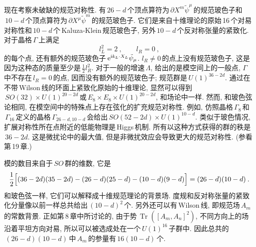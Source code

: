现在考察未破缺的规范对称性. 有\,$26{-}d$\,个顶点算符为$\,\partial X^{m}\tilde{\psi}^{\mu}\,$的规范玻色子和$\,10{-}d\,$个顶点算符为$\,\partial X^{\mu}\tilde{\psi}^{m}\,$的规范玻色子.  它们是来自十维理论的原始\,16\,个对易对称性和$\,10-d\,$个\,Kaluza-Klein\,规范玻色子, 另外\,$10-d\,$个反对称张量的紧致化. 对于晶格$\,\Gamma\,$上满足
\begin{equation}
l_{L}^{2}=2 \:, \qquad l_{R}=0 \:, \label{11.6.15}    
\end{equation}
的每个点, 还有额外的规范玻色子$\,\mathrm{e}^{\mathrm{i} k_{L}\cdot X_{L}}\tilde{\psi}_{\mu}$. $l_{R}\neq 0\,$的点上没有规范玻色子, 这是因为这种态的质量至少是$\,\frac{1}{2}l_{R}^{2}$. 对于一般的增速$\,\Lambda$, 给出的是模空间上的一般点, $\Gamma\,$中不存在$\,l_{R}=0\,$的点, 因而没有额外的规范玻色子; 规范群是$\,U(1)^{36-2d}$. 通过在不带\,Wilson\,线的环面上紧致化原始的十维理论, 显然可以得到$\,SO(32)\times U(1)^{20-2d}\,$或$\,E_{8}\times E_{8}\times U(1)^{20-2d}$, 和场论中一样. 然而, 和玻色弦论相同, 在模空间中的特殊点上存在弦化的扩充规范对称性. 例如, 仿照晶格$\,\Gamma_{8}\,$和$\,\Gamma_{16}\,$定义的晶格$\,\Gamma_{26-d,10-d}\,$会给出$\,SO(52-2d)\times U(1)^{10-d}$. 类似于玻色情况, 扩展对称性所在点附近的低能物理是\,Higgs\,机制. 所有以这种方式获得的群的秩是$\,36-2d$. 这是微扰论中的最大值, 但是非微扰效应会导致更大的规范对称性. (参看第\,19\,章.)

模的数目来自于$\,SO\,$群的维数, 它是
\begin{equation}
    \frac{1}{2}\Bigl[(36-2d)(35-2d)-(26-d)(25-d)-(10-d)(9-d)\Bigr]=(26-d)(10-d) \:. \label{11.6.16}
\end{equation}
和玻色弦一样, 它们可以解释成十维规范理论的背景场. 度规和反对称张量的紧致化分量像以前一样总共给出$\,(10-d)^{2}\,$个. 另外还可以有\,Wilson\,线, 即规范场$\,A_{m}\,$的常数背景. 正如第\,8\,章中所讨论的, 由于势$\,\operatorname{Tr}([A_{m},A_{n}]^{2})$, 不同方向上的场沿着平坦方向对易, 所以可以被选成处在一个$\,U(1)^{16}\,$子群中. 因此总共的$\,(26-d)(10-d)\,$中$\,A_{m}\,$的参量有$\,16(10-d)\,$个.

